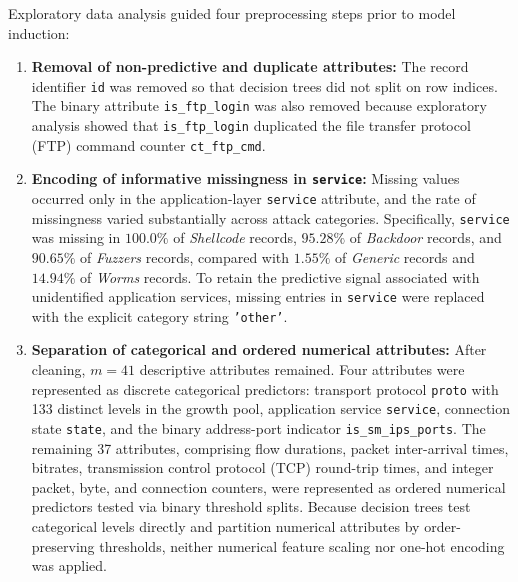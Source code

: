 Exploratory data analysis guided four preprocessing steps prior to model induction:
\begin{enumerate}
    \item \textbf{Removal of non-predictive and duplicate attributes:} The record identifier \texttt{id} was removed so that decision trees did not split on row indices. The binary attribute \texttt{is\_ftp\_login} was also removed because exploratory analysis showed that \texttt{is\_ftp\_login} duplicated the file transfer protocol (FTP) command counter \texttt{ct\_ftp\_cmd}.
    \item \textbf{Encoding of informative missingness in \texttt{service}:} Missing values occurred only in the application-layer \texttt{service} attribute, and the rate of missingness varied substantially across attack categories. Specifically, \texttt{service} was missing in $100.0\%$ of \emph{Shellcode} records, $95.28\%$ of \emph{Backdoor} records, and $90.65\%$ of \emph{Fuzzers} records, compared with $1.55\%$ of \emph{Generic} records and $14.94\%$ of \emph{Worms} records. To retain the predictive signal associated with unidentified application services, missing entries in \texttt{service} were replaced with the explicit category string \texttt{'other'}.
    \item \textbf{Separation of categorical and ordered numerical attributes:} After cleaning, $m = 41$ descriptive attributes remained. Four attributes were represented as discrete categorical predictors: transport protocol \texttt{proto} with 133 distinct levels in the growth pool, application service \texttt{service}, connection state \texttt{state}, and the binary address-port indicator \texttt{is\_sm\_ips\_ports}. The remaining 37 attributes, comprising flow durations, packet inter-arrival times, bitrates, transmission control protocol (TCP) round-trip times, and integer packet, byte, and connection counters, were represented as ordered numerical predictors tested via binary threshold splits. Because decision trees test categorical levels directly and partition numerical attributes by order-preserving thresholds, neither numerical feature scaling nor one-hot encoding was applied.

\end{enumerate}
